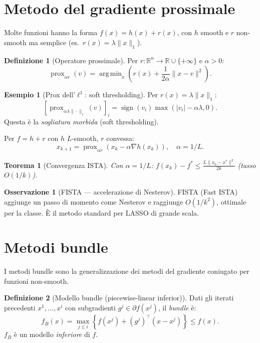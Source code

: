 \documentclass[11pt, a4paper, twoside]{book}
\theoremstyle{definition}
\newtheorem{defn}{Definizione}[chapter]
\newtheorem{example}{Esempio}[chapter]
\newtheorem{remark}{Osservazione}[chapter]
\theoremstyle{plain}
\newtheorem{thm}{Teorema}[chapter]
\theoremstyle{remark}
\DeclareMathOperator*{\argmin}{arg\,min}
\DeclareMathOperator{\sign}{sign}
\DeclareMathOperator{\prox}{prox}
\newcommand{\R}{\mathbb{R}}
\begin{document}
\section{Metodo del gradiente prossimale}
\label{sec:prox-gradient}

Molte funzioni hanno la forma $f(x) = h(x) + r(x)$, con $h$ smooth e $r$ non-smooth ma semplice (es.\ $r(x) = \lambda \|x\|_1$).

\begin{defn}[Operatore prossimale]
Per $r: \R^n \to \R \cup \{+\infty\}$ e $\alpha > 0$:
\[
  \prox_{\alpha r}(v) = \argmin_x \left(r(x) + \frac{1}{2\alpha}\|x - v\|^2\right).
\]
\end{defn}

\begin{example}[Prox dell'$\ell^1$: soft thresholding]
Per $r(x) = \lambda\|x\|_1$:
\[
  [\prox_{\alpha\lambda\|\cdot\|_1}(v)]_i = \sign(v_i)\max(|v_i| - \alpha\lambda, 0).
\]
Questa è la \emph{sogliatura morbida} (soft thresholding).
\end{example}

\begin{algobox}
Per $f = h + r$ con $h$ $L$-smooth, $r$ convessa:
\[
  x_{k+1} = \prox_{\alpha r}\left(x_k - \alpha \nabla h(x_k)\right), \quad \alpha = 1/L.
\]
\end{algobox}

\begin{thm}[Convergenza ISTA]
Con $\alpha = 1/L$: $f(x_k) - f^* \leq \frac{L\|x_0 - x^*\|^2}{2k}$ (tasso $O(1/k)$).
\end{thm}

\begin{remark}[FISTA — accelerazione di Nesterov]
FISTA (Fast ISTA) aggiunge un passo di momento come Nesterov e raggiunge $O(1/k^2)$, ottimale per la classe. È il metodo standard per LASSO di grande scala.
\end{remark}

\section{Metodi bundle}
\label{sec:bundle}

I metodi bundle sono la generalizzazione dei metodi del gradiente coniugato per funzioni non-smooth.

\begin{defn}[Modello bundle (piecewise-linear inferior)]
Dati gli iterati precedenti $x^1, \ldots, x^i$ con subgradienti $g^j \in \partial f(x^j)$, il \emph{bundle} è:
\[
  f_B(x) = \max_{j \leq i} \left\{f(x^j) + (g^j)^\top(x - x^j)\right\} \leq f(x).
\]
$f_B$ è un modello \emph{inferiore} di $f$.
\end{defn}
\end{document}
